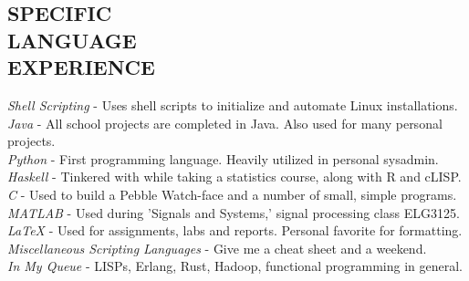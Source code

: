 \documentclass[margin]{res}
\begin{document}
\begin{resume}
\section{SPECIFIC \\ LANGUAGE \\ EXPERIENCE} 
{\sl Shell Scripting} - Uses shell scripts to initialize and automate Linux installations.\\       
{\sl Java} - All school projects are completed in Java. Also used for many personal projects.\\
{\sl Python} - First programming language. Heavily utilized in personal sysadmin.\\
{\sl Haskell} -  Tinkered with while taking a statistics course, along with R and cLISP.\\
{\sl C} - Used to build a Pebble Watch-face and a number of small, simple programs.\\
{\sl MATLAB} - Used during 'Signals and Systems,' signal processing class ELG3125.\\
{\sl LaTeX} -  Used for assignments, labs and reports. Personal favorite for formatting.\\
{\sl Miscellaneous Scripting Languages} -  Give me a cheat sheet and a weekend.\\
{\sl In My Queue} - LISPs, Erlang, Rust, Hadoop, functional programming in general.


\end{resume}
\end{document}
